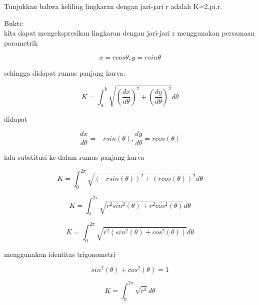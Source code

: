 \documentclass{article}
\begin{document}
\begin{eulernotebook}
\begin{eulercomment}
\begin{eulercomment}
\begin{eulercomment}
\begin{eulercomment}
\begin{eulercomment}
\begin{eulercomment}
\begin{eulercomment}
Tunjukkan bahwa keliling lingkaran dengan jari-jari r adalah K=2.pi.r.

Bukti:\\
kita dapat mengekspresikan lingkaran dengan jari-jari r menggunakan
persamaan parametrik\\
\end{eulercomment}
\begin{eulerformula}
\[
x=rcos\theta , y=rsin\theta
\]
\end{eulerformula}
\begin{eulercomment}
sehingga didapat rumus panjang kurva:\\
\end{eulercomment}
\begin{eulerformula}
\[
K=\int_a^b \sqrt{\left(\frac{dx}{d\theta}\right)^{2}+\left(\frac{dy}{d\theta}\right)^{2}} d\theta
\]
\end{eulerformula}
\begin{eulercomment}
didapat\\
\end{eulercomment}
\begin{eulerformula}
\[
\frac{dx}{d\theta}=-rsin(\theta), \frac{dy}{d\theta}=rcos(\theta)
\]
\end{eulerformula}
\begin{eulercomment}
lalu substitusi ke dalam rumus panjang kurva\\
\end{eulercomment}
\begin{eulerformula}
\[
K=\int_0^{2\pi} \sqrt{(-rsin(\theta))^{2}+(rcos(\theta))^2} d\theta
\]
\end{eulerformula}
\begin{eulerformula}
\[
K=\int_0^{2\pi} \sqrt{r^{2}sin^{2}(\theta)+r^{2}cos^{2}(\theta)}d\theta
\]
\end{eulerformula}
\begin{eulerformula}
\[
K=\int_0^{2\pi} \sqrt{r^{2}(sin^{2}(\theta)+cos^{2}(\theta))}d\theta
\]
\end{eulerformula}
\begin{eulercomment}
menggunakan identitas trigonometri\\
\end{eulercomment}
\begin{eulerformula}
\[
sin^{2}(\theta)+cos^{2}(\theta)=1
\]
\end{eulerformula}
\begin{eulerformula}
\[
K=\int_0^{2\pi} \sqrt{r^{2}}d\theta
\]
\end{eulerformula}

\end{eulercomment}
\end{eulercomment}
\end{eulercomment}
\end{eulercomment}
\end{eulercomment}
\end{eulercomment}
\end{eulernotebook}
\end{document}
